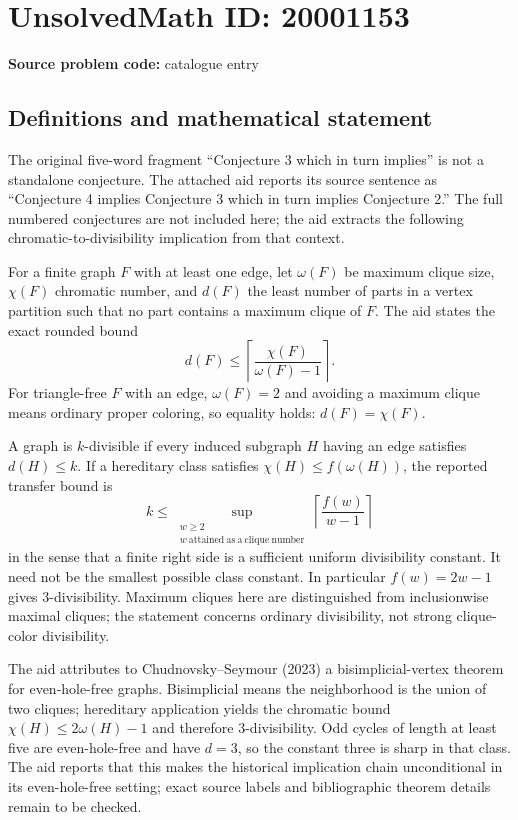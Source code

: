 \documentclass[11pt]{article}
\begin{document}
\section*{UnsolvedMath ID: 20001153}
\textbf{Source problem code:} catalogue entry
\subsection{Definitions and mathematical statement}
The original five-word fragment ``Conjecture 3 which in turn implies'' is not a standalone conjecture. The attached aid reports its source sentence as ``Conjecture 4 implies Conjecture 3 which in turn implies Conjecture 2.'' The full numbered conjectures are not included here; the aid extracts the following chromatic-to-divisibility implication from that context.

For a finite graph $F$ with at least one edge, let $\omega(F)$ be maximum clique size, $\chi(F)$ chromatic number, and $d(F)$ the least number of parts in a vertex partition such that no part contains a maximum clique of $F$. The aid states the exact rounded bound
\[
d(F)\le\left\lceil\frac{\chi(F)}{\omega(F)-1}\right\rceil.
\]
For triangle-free $F$ with an edge, $\omega(F)=2$ and avoiding a maximum clique means ordinary proper coloring, so equality holds: $d(F)=\chi(F)$.

A graph is $k$-divisible if every induced subgraph $H$ having an edge satisfies $d(H)\le k$. If a hereditary class satisfies $\chi(H)\le f(\omega(H))$, the reported transfer bound is
\[
k\le\sup_{\substack{w\ge2\\w\ \mathrm{attained\ as\ a\ clique\ number}}}
\left\lceil\frac{f(w)}{w-1}\right\rceil
\]
in the sense that a finite right side is a sufficient uniform divisibility constant. It need not be the smallest possible class constant. In particular $f(w)=2w-1$ gives $3$-divisibility. Maximum cliques here are distinguished from inclusionwise maximal cliques; the statement concerns ordinary divisibility, not strong clique-color divisibility.

The aid attributes to Chudnovsky--Seymour (2023) a bisimplicial-vertex theorem for even-hole-free graphs. Bisimplicial means the neighborhood is the union of two cliques; hereditary application yields the chromatic bound $\chi(H)\le2\omega(H)-1$ and therefore $3$-divisibility. Odd cycles of length at least five are even-hole-free and have $d=3$, so the constant three is sharp in that class. The aid reports that this makes the historical implication chain unconditional in its even-hole-free setting; exact source labels and bibliographic theorem details remain to be checked.
\end{document}
